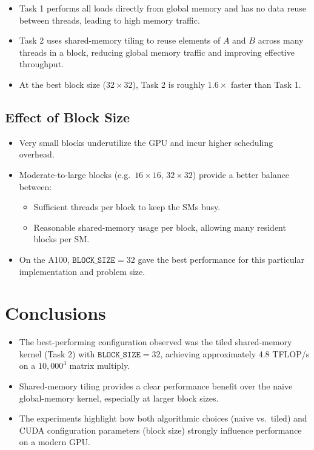 \documentclass[11pt]{article}
\begin{document}
\begin{itemize}
  \item Task 1 performs all loads directly from global memory and has no data reuse between threads, leading to high memory traffic.
  \item Task 2 uses shared-memory tiling to reuse elements of \(A\) and \(B\) across many threads in a block, reducing global memory traffic and improving effective throughput.
  \item At the best block size (\(32 \times 32\)), Task 2 is roughly \(1.6\times\) faster than Task 1.
\end{itemize}

\subsection*{Effect of Block Size}

\begin{itemize}
  \item Very small blocks underutilize the GPU and incur higher scheduling overhead.
  \item Moderate-to-large blocks (e.g.\ \(16 \times 16\), \(32 \times 32\)) provide a better balance between:
  \begin{itemize}
    \item Sufficient threads per block to keep the SMs busy.
    \item Reasonable shared-memory usage per block, allowing many resident blocks per SM.
  \end{itemize}
  \item On the A100, \(\texttt{BLOCK\_SIZE} = 32\) gave the best performance for this particular implementation and problem size.
\end{itemize}

\section{Conclusions}

\begin{itemize}
  \item The best-performing configuration observed was the tiled shared-memory kernel (Task 2) with \(\texttt{BLOCK\_SIZE} = 32\), achieving approximately 4.8 TFLOP/s on a \(10{,}000^3\) matrix multiply.
  \item Shared-memory tiling provides a clear performance benefit over the naive global-memory kernel, especially at larger block sizes.
  \item The experiments highlight how both algorithmic choices (naive vs.\ tiled) and CUDA configuration parameters (block size) strongly influence performance on a modern GPU.
\end{itemize}
\end{document}
